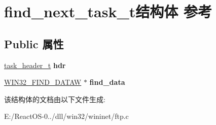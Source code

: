\hypertarget{structfind__next__task__t}{}\section{find\+\_\+next\+\_\+task\+\_\+t结构体 参考}
\label{structfind__next__task__t}
\subsection*{Public 属性}
\begin{DoxyCompactItemize}
\item 
\mbox{\label{structfind__next__task__t_ae4faed16fd2dcd696f8d2ecb6260f01c}} 
\hyperlink{structtask__header__t}{task\+\_\+header\+\_\+t} {\bfseries hdr}
\item 
\mbox{\label{structfind__next__task__t_a444c660d9d8f6fc5f6e91327fb4f47c2}} 
\hyperlink{struct_w_i_n32___f_i_n_d___d_a_t_a_a}{W\+I\+N32\+\_\+\+F\+I\+N\+D\+\_\+\+D\+A\+T\+AW} $\ast$ {\bfseries find\+\_\+data}
\end{DoxyCompactItemize}


该结构体的文档由以下文件生成\+:\begin{DoxyCompactItemize}
\item 
E\+:/\+React\+O\+S-\/0../dll/win32/wininet/ftp.\+c\end{DoxyCompactItemize}
